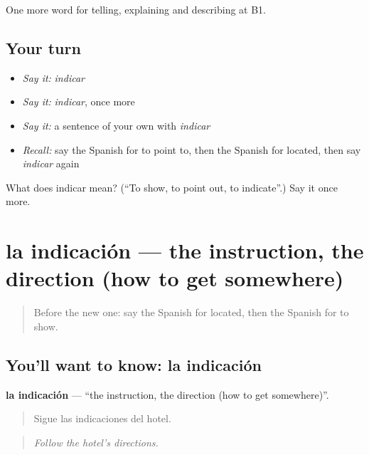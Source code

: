 \begin{grammarlens}[title={What you've built}]
One more word for telling, explaining and describing at B1.
\end{grammarlens}

\subsection*{Your turn}
\begin{itemize}
\raggedright
  \item \emph{Say it:} \emph{indicar}
  \item \emph{Say it:} \emph{indicar}, once more
  \item \emph{Say it:} a sentence of your own with \emph{indicar}
  \item \emph{Recall:} say the Spanish for to point to, then the Spanish for located, then say \emph{indicar} again
\end{itemize}

\begin{tcolorbox}[breakable,colback=teal!4,colframe=teal!35!black,title={Before you move on}]
What does indicar mean? (\textquotedblleft{}To show, to point out, to indicate\textquotedblright{}.) Say it once more.
\end{tcolorbox}
\section[la indicación]{la indicación — the instruction, the direction (how to get somewhere)}

\label{lesson:ES-C670-indicacion}



\begin{quote}
Before the new one: say the Spanish for located, then the Spanish for to show.
\end{quote}

\subsection*{You'll want to know: la indicación}
\textbf{la indicación} — \textquotedblleft{}the instruction, the direction (how to get somewhere)\textquotedblright{}.

\begin{quote}
Sigue las indicaciones del hotel.
\end{quote}

\begin{quote}
\emph{Follow the hotel’s directions.}
\end{quote}

